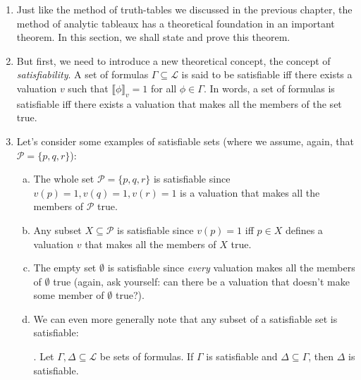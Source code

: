 	\begin{enumerate}[\thesection.1]

		\item Just like the method of truth-tables we discussed in the previous chapter, the method of analytic tableaux has a theoretical foundation in an important theorem. In this section, we shall state and prove this theorem.
		
		\item  But first, we need to introduce a new theoretical concept, the concept of \emph{satisfiability}. A set of formulas $\Gamma\subseteq\mathcal{L}$ is said to be satisfiable iff there exists a valuation $v$ such that $\llbracket\phi\rrbracket_v=1$ for all $\phi\in\Gamma$. In words, a set of formulas is satisfiable iff there exists a valuation that makes all the members of the set true. 
		
		\item Let's consider some examples of satisfiable sets (where we assume, again, that $\mathcal{P}=\{p,q,r\}$):
		
			\begin{enumerate}[(a)]
			
				\item The whole set $\mathcal{P}=\{p,q,r\}$ is satisfiable since $v(p)=1, v(q)=1, v(r)=1$ is a valuation that makes all the members of $\mathcal{P}$ true.
				
				\item Any subset $X\subseteq \mathcal{P}$ is satisfiable since $v(p)=1$ iff $p\in X$ defines a valuation $v$ that makes all the members of $X$ true.
				
				\item The empty set $\emptyset$ is satisfiable since \emph{every} valuation makes all the members of $\emptyset$ true (again, ask yourself: can there be a valuation that doesn't make some member of $\emptyset$ true?). 
				
				\item We can even more generally note that any subset of a satisfiable set is satisfiable:
				
				\begin{proposition}. Let $\Gamma,\Delta\subseteq\mathcal{L}$ be sets of formulas. If $\Gamma$ is satisfiable and $\Delta\subseteq \Gamma$, then $\Delta$ is satisfiable.
				\end{proposition}
				

\end{enumerate}
\end{enumerate}
